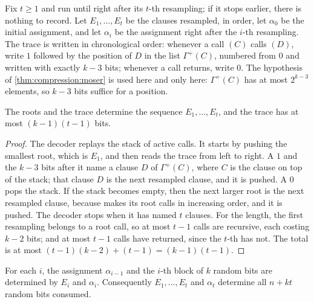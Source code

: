 \begin{refsection}
Fix $t\ge1$ and run \compressionSolve{} until right after its $t$-th resampling; if it stops earlier, there is nothing to record. Let $E_1,\dots,E_t$ be the clauses resampled, in order, let $\alpha_0$ be the initial assignment, and let $\alpha_i$ be the assignment right after the $i$-th resampling. The trace is written in chronological order: whenever a call \compressionFix$(C)$ calls \compressionFix$(D)$, write $1$ followed by the position of $D$ in the list $\Gamma^+(C)$, numbered from $0$ and written with exactly $k-3$ bits; whenever a call returns, write $0$. The hypothesis of \cref{thm:compression:moser} is used here and only here: $\Gamma^+(C)$ has at most $2^{k-3}$ elements, so $k-3$ bits suffice for a position.

\begin{lemma}\label{lem:compression:log}
The roots and the trace determine the sequence $E_1,\dots,E_t$, and the trace has at most $(k-1)(t-1)$ bits.
\end{lemma}

\begin{proof}
The decoder replays the stack of active calls. It starts by pushing the smallest root, which is $E_1$, and then reads the trace from left to right. A $1$ and the $k-3$ bits after it name a clause $D$ of $\Gamma^+(C)$, where $C$ is the clause on top of the stack; that clause $D$ is the next resampled clause, and it is pushed. A $0$ pops the stack. If the stack becomes empty, then the next larger root is the next resampled clause, because \compressionSolve{} makes its root calls in increasing order, and it is pushed. The decoder stops when it has named $t$ clauses. For the length, the first resampling belongs to a root call, so at most $t-1$ calls are recursive, each costing $k-2$ bits; and at most $t-1$ calls have returned, since the $t$-th has not. The total is at most $(t-1)(k-2)+(t-1)=(k-1)(t-1)$.
\end{proof}

\begin{lemma}[Rewinding]\label{lem:compression:rewind}
For each $i$, the assignment $\alpha_{i-1}$ and the $i$-th block of $k$ random bits are determined by $E_i$ and $\alpha_i$. Consequently $E_1,\dots,E_t$ and $\alpha_t$ determine all $n+kt$ random bits consumed.
\end{lemma}


\end{refsection}

